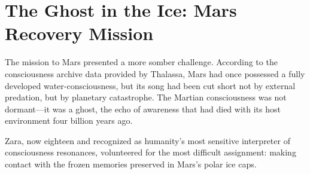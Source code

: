\section{The Ghost in the Ice: Mars Recovery Mission}

The mission to Mars presented a more somber challenge. According to the consciousness archive data provided by Thalassa, Mars had once possessed a fully developed water-consciousness, but its song had been cut short not by external predation, but by planetary catastrophe. The Martian consciousness was not dormant—it was a ghost, the echo of awareness that had died with its host environment four billion years ago.

Zara, now eighteen and recognized as humanity's most sensitive interpreter of consciousness resonances, volunteered for the most difficult assignment: making contact with the frozen memories preserved in Mars's polar ice caps.

